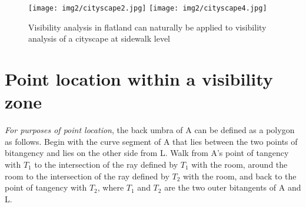 \documentclass[9pt,twocolumn]{article}
\newif\ifJournal
\begin{document}

\begin{figure}
\begin{center}
\texttt{[image: img2/cityscape2.jpg]}
\texttt{[image: img2/cityscape4.jpg]}
\end{center}
\caption{Visibility analysis in flatland can naturally be applied to visibility
         analysis of a cityscape at sidewalk level}
\label{fig:cityscape}
\end{figure}




%
%

\ifJournal
\section{Point location within a visibility zone}

{\em For purposes of point location}, the back umbra of A can be defined 
as a polygon as follows.
Begin with the curve segment of A that lies between the two points of
bitangency and lies on the other side from L.
Walk from A's point of tangency with $T_1$ to the intersection
of the ray defined by $T_1$ with the room, around the room to 
the intersection of the ray defined by $T_2$ with the room, and back
to the point of tangency with $T_2$,
where $T_1$ and $T_2$ are the two outer bitangents of A and L.
\end{document}
